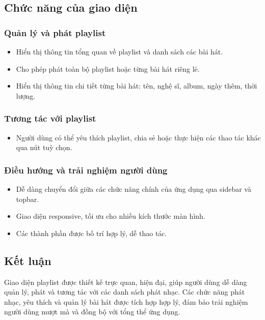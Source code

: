 \documentclass{book}
\begin{document}
\subsection{Chức năng của giao diện}

\subsubsection{Quản lý và phát playlist}
\begin{itemize}
    \item Hiển thị thông tin tổng quan về playlist và danh sách các bài hát.
    \item Cho phép phát toàn bộ playlist hoặc từng bài hát riêng lẻ.
    \item Hiển thị thông tin chi tiết từng bài hát: tên, nghệ sĩ, album, ngày thêm, thời lượng.
\end{itemize}

\subsubsection{Tương tác với playlist}
\begin{itemize}
    \item Người dùng có thể yêu thích playlist, chia sẻ hoặc thực hiện các thao tác khác qua nút tuỳ chọn.
\end{itemize}

\subsubsection{Điều hướng và trải nghiệm người dùng}
\begin{itemize}
    \item Dễ dàng chuyển đổi giữa các chức năng chính của ứng dụng qua sidebar và topbar.
    \item Giao diện responsive, tối ưu cho nhiều kích thước màn hình.
    \item Các thành phần được bố trí hợp lý, dễ thao tác.
\end{itemize}

\subsection{Kết luận}
Giao diện playlist được thiết kế trực quan, hiện đại, giúp người dùng dễ dàng quản lý, phát và tương tác với các danh sách phát nhạc. Các chức năng phát nhạc, yêu thích và quản lý bài hát được tích hợp hợp lý, đảm bảo trải nghiệm người dùng mượt mà và đồng bộ với tổng thể ứng dụng.
\end{document}
